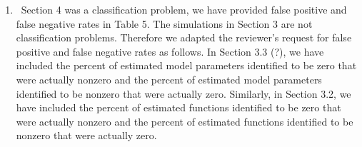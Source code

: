 \documentclass[]{article}
\newcommand{\reply}{\item[]\ }
\begin{document}
\begin{enumerate}
		\reply Section 4 was a classification problem, we have provided false positive and false negative rates in Table 5. The simulations in Section 3 are not classification problems. Therefore we adapted the reviewer's request for false positive and false negative rates as follows. In Section 3.3 (?), we have included the percent of estimated model parameters identified to be zero that were actually nonzero and the percent of estimated model parameters identified to be nonzero that were actually zero. Similarly, in Section 3.2, we have included the percent of estimated functions identified to be zero that were actually nonzero and the percent of estimated functions identified to be nonzero that were actually zero.
	\end{enumerate}
\end{document}
